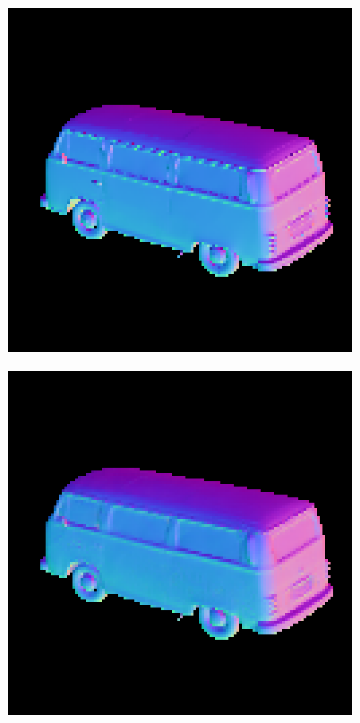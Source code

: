 \begin{figure}
\begin{subfigure}[b]{0.19\linewidth}
	\end{subfigure}
	\begin{subfigure}[b]{0.19\linewidth}
		\includegraphics[width=\linewidth]{./Figures/gcnn_synthetic/fancy_eval_9_groundtruth.png}
	\end{subfigure}
	\begin{subfigure}[b]{0.19\linewidth}
		\includegraphics[width=\linewidth]{./Figures/gcnn_synthetic/fancy_eval_9_normal_an2-8-1000.png}

\end{subfigure}
\end{figure}
